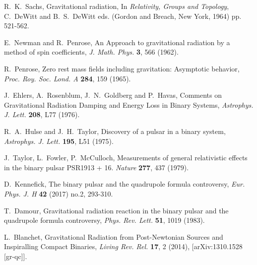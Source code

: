 \documentclass{ws-procs961x669}            %
\begin{document}
\begin{thebibliography}{99}
R.~K.~Sachs, Gravitational radiation, In \emph{Relativity, Groups
and Topology}, C.~DeWitt and B.~S.~DeWitt eds. (Gordon and Breach,
New York, 1964) pp. 521-562.

E.~Newman and R.~Penrose, An Approach to gravitational radiation
by a method of spin coefficients, {\it J. Math. Phys.} \textbf{3},
566 (1962).

R.~Penrose, Zero rest mass fields including gravitation:
Asymptotic behavior, {\it Proc. Roy. Soc. Lond. A} \textbf{284},
159 (1965).

J.~Ehlers, A.~Rosenblum, J.~N.~Goldberg and P.~Havas, Comments on
Gravitational Radiation Damping and Energy Loss in Binary Systems,
{\it Astrophys. J. Lett.} {\bf 208}, L77 (1976).

R.~A.~Hulse and J.~H.~Taylor, Discovery of a pulsar in a binary
system, {\it Astrophys. J. Lett.} \textbf{195}, L51 (1975).

J.~Taylor, L.~Fowler, P.~McCulloch, Measurements of general
relativistic effects in the binary pulsar PSR1913 + 16. {\it
Nature} {\bf 277}, 437 (1979).

D.~Kennefick, The binary pulsar and the quadrupole formula
controversy, {\it Eur. Phys. J. H} \textbf{42} (2017) no.2,
293-310.

T.~Damour, Gravitational radiation reaction in the binary pulsar
and the quadrupole formula controversy, {\it Phys. Rev. Lett.}
\textbf{51}, 1019 (1983).

L.~Blanchet, Gravitational Radiation from Post-Newtonian Sources
and Inspiralling Compact Binaries, {\it Living Rev. Rel.}
\textbf{17}, 2 (2014), [arXiv:1310.1528 [gr-qc]].

\end{thebibliography}
\end{document}
